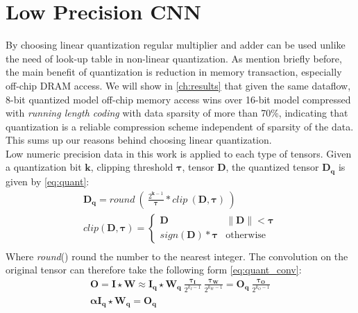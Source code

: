  
\section{Low Precision CNN}
By choosing linear quantization regular multiplier and adder can be used unlike the need of look-up table in non-linear quantization. As mention briefly before, the main benefit of quantization is reduction in memory transaction, especially off-chip DRAM access. We will show in \autoref{ch:results} that given the same dataflow, 8-bit quantized model off-chip memory access wins over 16-bit model compressed with \textit{running length coding} with data sparsity of more than 70\%, indicating that quantization is a reliable compression scheme independent of sparsity of the data. This sums up our reasons behind choosing linear quantization. \\
Low numeric precision data in this work is applied to each type of tensors. Given a quantization bit $\boldsymbol{k}$, clipping threshold $\boldsymbol{\tau}$, tensor $\boldsymbol{D}$, the quantized tensor $\boldsymbol{D_q}$ is given by \autoref{eq:quant}:
\begin{equation}
    \begin{aligned}\label{eq:quant}
        \boldsymbol{D_q}=
        \textit{round}\ (\ \frac{2^{\boldsymbol{k}-1}}{\boldsymbol{\tau}}*\textit{clip}\ (\boldsymbol{D},\boldsymbol{\tau})
        \ ) \\
        \textit{clip}(\boldsymbol{D},\boldsymbol{\tau})=\begin{cases}
            \boldsymbol{D} &\|\boldsymbol{D}\|<\boldsymbol{\tau} \\
            \textit{sign}(\boldsymbol{D})*\boldsymbol{\tau} &\text{otherwise}
        \end{cases} \\
    \end{aligned}
\end{equation}
Where \textit{round}() round the number to the nearest integer. The convolution on the original tensor can therefore take the following form \autoref{eq:quant_conv}:
\begin{equation}
    \begin{aligned}\label{eq:quant_conv}
        \boldsymbol{O}=\boldsymbol{I}\star\boldsymbol{W} \approx\boldsymbol{I_q}\star\boldsymbol{W_q}
        \ \frac{\boldsymbol{\tau_I}}{2^{k_I-1}}
        \ \frac{\boldsymbol{\tau_W}}{2^{k_W-1}}
        =\boldsymbol{O_q}\  \frac{\boldsymbol{\tau_O}}{2^{k_O-1}} \\
        \boldsymbol{\alpha}\boldsymbol{I_q}\star\boldsymbol{W_q}=\boldsymbol{O_q}
    \end{aligned}
\end{equation}
